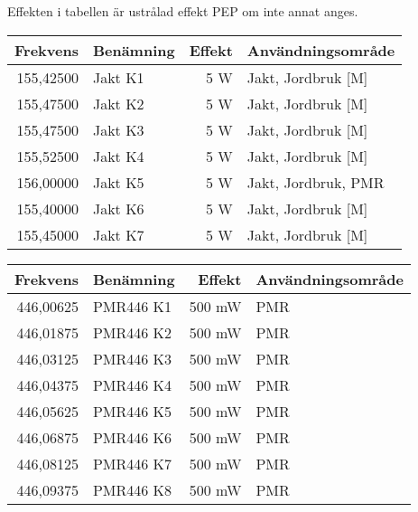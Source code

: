 \documentclass[12pt,swedish,a4paper]{article}
\begin{document}
Effekten i tabellen är ustrålad effekt PEP om inte annat anges.\\

\begin{tabular}{rlrl}
	\textbf{Frekvens} & \textbf{Benämning} & \textbf{Effekt} & \textbf{Användningsområde} \\ \hline
	        155,42500 & Jakt K1            &             5 W & Jakt, Jordbruk [M]         \\
	        155,47500 & Jakt K2            &             5 W & Jakt, Jordbruk [M]         \\
	        155,47500 & Jakt K3            &             5 W & Jakt, Jordbruk [M]         \\
	        155,52500 & Jakt K4            &             5 W & Jakt, Jordbruk [M]         \\
	        156,00000 & Jakt K5            &             5 W & Jakt, Jordbruk, PMR        \\
	        155,40000 & Jakt K6            &             5 W & Jakt, Jordbruk [M]         \\
	        155,45000 & Jakt K7            &             5 W & Jakt, Jordbruk [M]         \\
\end{tabular}

\begin{tabular}{rlrl}
	\textbf{Frekvens} & \textbf{Benämning} & \textbf{Effekt} & \textbf{Användningsområde} \\ \hline
	        446,00625 & PMR446 K1          &          500 mW & PMR                        \\
	        446,01875 & PMR446 K2          &          500 mW & PMR                        \\
	        446,03125 & PMR446 K3          &          500 mW & PMR                        \\
	        446,04375 & PMR446 K4          &          500 mW & PMR                        \\
	        446,05625 & PMR446 K5          &          500 mW & PMR                        \\
	        446,06875 & PMR446 K6          &          500 mW & PMR                        \\
	        446,08125 & PMR446 K7          &          500 mW & PMR                        \\
	        446,09375 & PMR446 K8          &          500 mW & PMR
\end{tabular}
\end{document}
